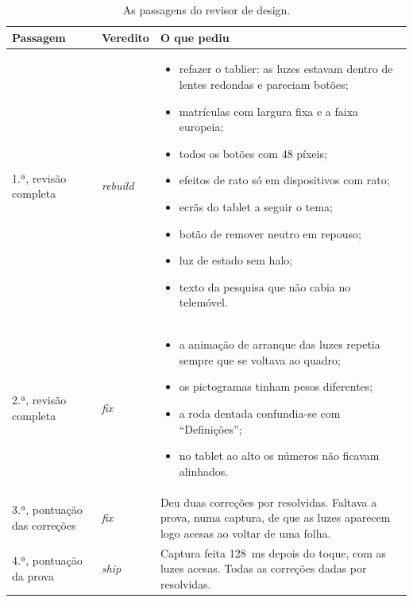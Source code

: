 \documentclass[a4paper,12pt]{article}
\begin{document}
\begin{table}[htbp]
\centering
\small
\begin{tabularx}{\textwidth}{@{}>{\raggedright\arraybackslash}p{3.1cm}>{\raggedright\arraybackslash}p{1.7cm}L@{}}
\toprule
\textbf{Passagem} & \textbf{Veredito} & \textbf{O que pediu} \\
\midrule
1.ª, revisão completa & \textit{rebuild} &
\begin{itemize}[leftmargin=*,nosep,before=\vspace{-\baselineskip}]
  \item refazer o tablier: as luzes estavam dentro de lentes redondas e pareciam botões;
  \item matrículas com largura fixa e a faixa europeia;
  \item todos os botões com 48 píxeis;
  \item efeitos de rato só em dispositivos com rato;
  \item ecrãs do tablet a seguir o tema;
  \item botão de remover neutro em repouso;
  \item luz de estado sem halo;
  \item texto da pesquisa que não cabia no telemóvel.
\end{itemize} \\
2.ª, revisão completa & \textit{fix} &
\begin{itemize}[leftmargin=*,nosep,before=\vspace{-\baselineskip}]
  \item a animação de arranque das luzes repetia sempre que se voltava ao quadro;
  \item os pictogramas tinham pesos diferentes;
  \item a roda dentada confundia-se com ``Definições'';
  \item no tablet ao alto os números não ficavam alinhados.
\end{itemize} \\
3.ª, pontuação das correções & \textit{fix} & Deu duas correções por resolvidas. Faltava a prova, numa captura, de que as luzes aparecem logo acesas ao voltar de uma folha. \\
4.ª, pontuação da prova & \textit{ship} & Captura feita 128~ms depois do toque, com as luzes acesas. Todas as correções dadas por resolvidas. \\
\bottomrule
\end{tabularx}
\caption{As passagens do revisor de design.}
\label{tab:revisoes}
\end{table}
\end{document}
